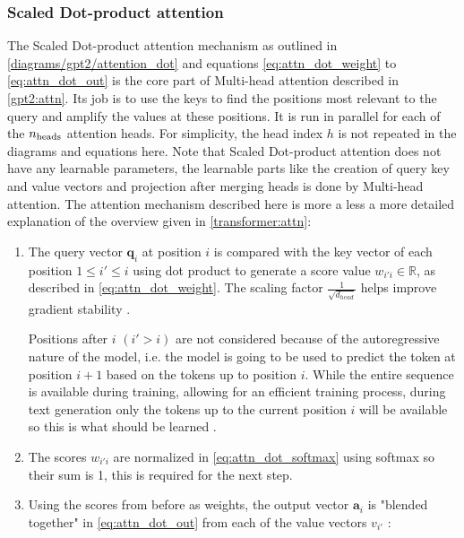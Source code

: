 \subsubsection{Scaled Dot-product attention}
\label{gpt2:attn_dot}
The Scaled Dot-product attention mechanism as outlined in \cref{diagrams/gpt2/attention_dot} and equations \eqref{eq:attn_dot_weight} to \eqref{eq:attn_dot_out} is the core part of Multi-head attention described in \cref{gpt2:attn}.
Its job is to use the keys to find the positions most relevant to the query and amplify the values at these positions.
It is run in parallel for each of the ${n_\textrm{heads}}$ attention heads. For simplicity, the head index $h$ is not repeated in the diagrams and equations here.
Note that Scaled Dot-product attention does not have any learnable parameters, the learnable parts like the creation of query key and value vectors and projection after merging heads is done by Multi-head attention.
The attention mechanism described here is more a less a more detailed explanation of the overview given in \cref{transformer:attn}:

\begin{enumerate}
\item The query vector $\mathbf{q}_i$ at position $i$ is compared with the key vector of each position $1 \leq i' \leq i$ using dot product to generate a score value $w_{i'i} \in \mathbb{R}$, as described in \cref{eq:attn_dot_weight}.
The scaling factor $\frac {1} {\sqrt{d_{head}}}$ helps improve gradient stability .

Positions after $i$ $(i' > i)$ are not considered because of the autoregressive nature of the model, i.e. the model is going to be used to predict the token at position $i+1$ based on the tokens up to position $i$. While the entire sequence is available during training, allowing for an efficient training process, during text generation only the tokens up to the current position $i$ will be available so this is what should be learned .

\item The scores $w_{i'i}$ are normalized in \cref{eq:attn_dot_softmax} using softmax so their sum is 1, this is required for the next step.

\item Using the scores from before as weights, the output vector $\mathbf{a}_i$ is "blended together" in \cref{eq:attn_dot_out} from each of the value vectors $v_{i'}$ \cite{alammar-gpt2}:
\end{enumerate}

